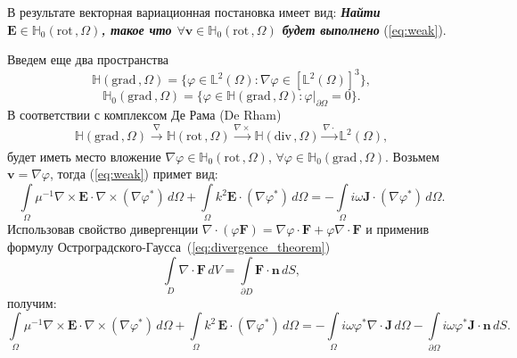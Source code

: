 \documentclass[a4paper,14pt]{article}
\begin{document}
В результате векторная вариационная постановка имеет вид: \textbf{\textit{Найти $\mathbf{E} \in \mathbb{H}_{0}( \mathrm{rot}\,, \Omega )$, такое что $\forall \mathbf{v} \in \mathbb{H}_{0}( \mathrm{rot}\,, \Omega )$ будет выполнено}} (\ref{eq:weak}).

Введем еще два пространства~\citep{monk}
\begin{equation*}
	\mathbb{H}( \mathrm{grad}\,, \Omega ) = \lbrace \varphi \in \mathbb{L}^{2}(\Omega) : \nabla \varphi \in [ \mathbb{L}^{2}(\Omega) ]^{3} \rbrace , \label{eq:H_grad}
\end{equation*}
\begin{equation*}
	\mathbb{H}_{0}( \mathrm{grad}\,, \Omega ) = \lbrace \varphi \in \mathbb{H}( \mathrm{grad}\,, \Omega ) : \left. \varphi \right | _{\partial \Omega} = 0 \rbrace . \label{eq:H0_grad}
\end{equation*}
В соответствии с комплексом Де Рама (De Rham)~\citep{schwarzbach}
\begin{equation}
	\mathbb{H}( \mathrm{grad}\,, \Omega ) \xrightarrow[]{\nabla} \mathbb{H}( \mathrm{rot}\,, \Omega ) \xrightarrow[]{\nabla \times} \mathbb{H}( \mathrm{div}\,, \Omega ) \xrightarrow[]{\nabla \cdot} \mathbb{L}^{2}(\Omega) , \label{eq:derham}
\end{equation}
будет иметь место вложение $\nabla \varphi \in \mathbb{H}_{0}( \mathrm{rot}\,, \Omega )$, $\forall \varphi \in \mathbb{H}_{0}( \mathrm{grad}\,, \Omega )$. Возьмем $\mathbf{v} = \nabla \varphi$, тогда (\ref{eq:weak}) примет вид:
\begin{equation*}
	\int\limits_\Omega \mu^{-1} \nabla \times \mathbf{E} \cdot \nabla \times (\nabla \varphi^{*}) \,d\Omega + \int\limits_\Omega k^{2} \mathbf{E} \cdot (\nabla \varphi^{*}) \,d\Omega = - \int\limits_\Omega i \omega \mathbf{J} \cdot (\nabla \varphi^{*}) \,d\Omega .
\end{equation*}
Использовав свойство дивергенции $\nabla \cdot (\varphi \mathbf{F}) = \nabla \varphi \cdot \mathbf{F} + \varphi \nabla \cdot \mathbf{F}$ и применив формулу Ос\-т\-ро\-г\-ра\-д\-с\-ко\-го-Гаусса~(\ref{eq:divergence_theorem})
\begin{equation}
	\int\limits_{D} \nabla \cdot \mathbf{F} \,dV = \int\limits_{\partial D} \mathbf{F} \cdot \mathbf{n} \,dS ,
	\label{eq:divergence_theorem}
\end{equation}
получим:
\begin{equation*}
	\int\limits_\Omega \mu^{-1} \nabla \times \mathbf{E} \cdot \nabla \times (\nabla \varphi^{*}) \,d\Omega + \int\limits_\Omega k^{2}\, \mathbf{E} \cdot (\nabla \varphi^{*}) \,d\Omega = - \int\limits_\Omega i \omega \varphi^{*} \nabla \cdot \mathbf{J} \,d\Omega - \int\limits_{\partial \Omega} i \omega \varphi^{*} \mathbf{J} \cdot \mathbf{n} \,d S .
\end{equation*}
\end{document}
